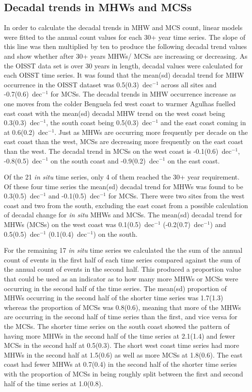 \documentclass[a4paper,10pt,review]{elsarticle}
\begin{document}
\subsection{Decadal trends in MHWs and MCSs}
In order to calculate the decadal trends in MHW and MCS count, linear models were fitted to the annual count values for each 30+ year time series. The slope of this line was then multiplied by ten to produce the following decadal trend values and show whether after 30+ years MHWs/ MCSs are increasing or decreasing. As the OISST data set is over 30 years in length, decadal values were calculated for each OISST time series. It was found that the mean(sd) decadal trend for MHW occurrence in the OISST dataset was 0.5(0.3)~dec$^{-1}$ across all sites and -0.7(0.6)~dec$^{-1}$ for MCSs. The decadal trends in MHW occurrence increase as one moves from the colder Benguela fed west coast to warmer Agulhas fuelled east coast with the mean(sd) decadal MHW trend on the west coast being 0.3(0.3)~dec$^{-1}$, the south coast being 0.5(0.3)~dec$^{-1}$ and the east coast coming in at 0.6(0.2)~dec$^{-1}$. Just as MHWs are occurring more frequently per decade on the east coast than the west, MCSs are decreasing more frequently on the east coast than the west. The decadal trend in MCSs on the west coast is -0.1(0.6)~dec$^{-1}$, -0.8(0.5)~dec$^{-1}$ on the south coast and -0.9(0.2)~dec$^{-1}$ on the east coast.

Of the 21 \emph{in situ} time series, only 4 of them reached the 30+ year requirement. Of these four time series the mean(sd) decadal trend for MHWs was found to be 0.3(0.5)~dec$^{-1}$ and -0.1(0.5)~dec$^{-1}$ for MCSs. There were two sites from the west coast and two from the south, excluding the east coast from a possible calculation of decadal change for \emph{in situ} MHWs and MCSs. The mean(sd) decadal trend for MHWs (MCSs) on the west coast was 0.1(0.5)~dec$^{-1}$ (-0.2(0.7)~dec$^{-1}$) and 0.5(0.5)~dec$^{-1}$ (0.1(0.4)~dec$^{-1}$) on the south.

For the remaining 17 \emph{in situ} time series we calculated the the sum of the annual count of events in the first half of each time series compared against the sum of the annual count of events in the second half. This produced a proportion value that could be used as an indicator as to how many more MHWs or MCSs were occurring in the second half of the time series. The mean(sd) proportion of MHWs occurring in the second half of the shorter time series was 1.7(1.3) whereas the proportion of MCSs was 0.8(0.6), meaning that more of the MHWs are occurring in the second half of time series than the first, and vice versa for the MCSs. The shorter time series on the south coast showed the pattern of having more MHWs in the second half of the time series at 2.1(1.4) and fewer MCSs in the second half at 0.5(0.3). The short west coast time series had more MHWs in the second half at 1.5(0.6) as well as more MCSs at 1.8(0.6). The east coast had fewer MHWs at 0.7(0.4) in the second half of the shorter time series with the proportion of MCSs in being roughly split between the first and second half of the time series at 1.0(0.8).
\end{document}
